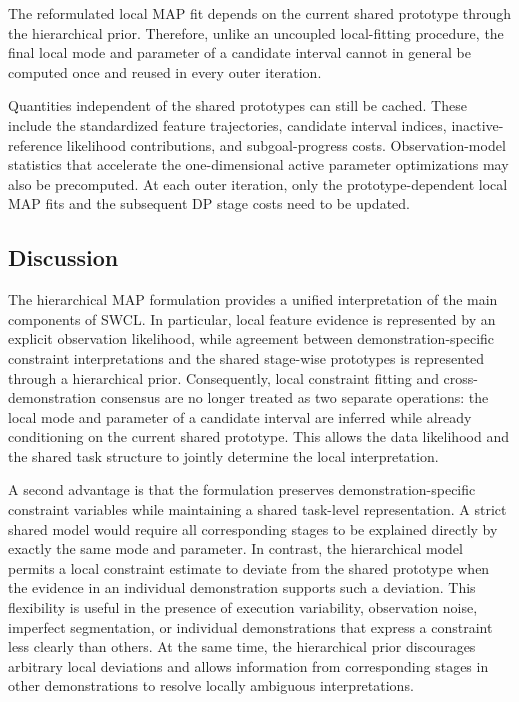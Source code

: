 \documentclass[lettersize,journal]{IEEEtran}
\begin{document}
The reformulated local MAP fit depends on the current shared prototype through
the hierarchical prior. Therefore, unlike an uncoupled local-fitting procedure,
the final local mode and parameter of a candidate interval cannot in general be
computed once and reused in every outer iteration.

Quantities independent of the shared prototypes can still be cached. These
include the standardized feature trajectories, candidate interval indices,
inactive-reference likelihood contributions, and subgoal-progress costs.
Observation-model statistics that accelerate the one-dimensional active
parameter optimizations may also be precomputed. At each outer iteration, only
the prototype-dependent local MAP fits and the subsequent DP stage costs need to
be updated.

\subsection{Discussion}
\label{subsec:map_discussion}

The hierarchical MAP formulation provides a unified interpretation of the main
components of SWCL. In particular, local feature evidence is represented by an
explicit observation likelihood, while agreement between demonstration-specific
constraint interpretations and the shared stage-wise prototypes is represented
through a hierarchical prior. Consequently, local constraint fitting and
cross-demonstration consensus are no longer treated as two separate operations:
the local mode and parameter of a candidate interval are inferred while already
conditioning on the current shared prototype. This allows the data likelihood
and the shared task structure to jointly determine the local interpretation.

A second advantage is that the formulation preserves demonstration-specific
constraint variables while maintaining a shared task-level representation. A
strict shared model would require all corresponding stages to be explained
directly by exactly the same mode and parameter. In contrast, the hierarchical
model permits a local constraint estimate to deviate from the shared prototype
when the evidence in an individual demonstration supports such a deviation.
This flexibility is useful in the presence of execution variability, observation
noise, imperfect segmentation, or individual demonstrations that express a
constraint less clearly than others. At the same time, the hierarchical prior
discourages arbitrary local deviations and allows information from corresponding
stages in other demonstrations to resolve locally ambiguous interpretations.
\end{document}
